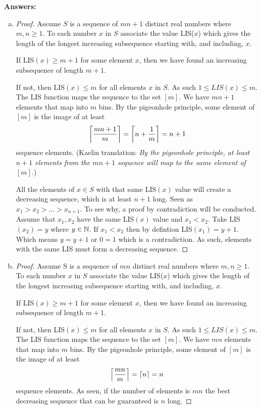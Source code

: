 \documentclass{article}
\begin{document}
\textbf{Answers:}
\begin{enumerate}[(a)]
    \item \begin{proof}
    Assume $S$ is a sequence of $mn+1$ distinct real numbers where $m,n \ge 1$. To each number $x$ in $S$ associate the value LIS($x$) which gives the length of the longest increasing subsequence starting with, and including, $x$. 
    
    \medskip
    If LIS$(x) \ge m + 1$ for some element $x$, then we have found an increasing subsequence of length $m + 1$. 
    
    \medskip
    If not, then LIS$(x) \le m$ for all elements $x$ in $S$. As such $1 \le LIS(x) \le m$. The LIS function maps the sequence to the set $[m]$. We have $mn+1$ elements that map into $m$ bins. By the pigeonhole principle, some element of $[m]$ is the image of at least
    \begin{equation*}
        \left\lceil \dfrac{mn+1}{m} \right\rceil = \left\lceil n+\dfrac{1}{m} \right\rceil = n+1
    \end{equation*}
    sequence elements. (Kaelin translation: \textit{By the pigeonhole principle, at least $n+1$ elements from the $mn+1$ sequence will map to the same element of $[m]$}.)

    \medskip
    All the elements of $x \in S$ with that same LIS$(x)$ value will create a decreasing sequence, which is at least $n+1$ long. Seen as $x_1 > x_2 > \dots > x_{n+1}$. To see why, a proof by contradiction will be conducted. Assume that $x_1, x_2$ have the same LIS$(x)$ value and $x_1 < x_2$. Take LIS$(x_2) = y$ where $y \in \mathbb N$. If $x_1 < x_2$ then by defintion LIS$(x_1) = y + 1$. Which means $y = y + 1$ or $0 = 1$ which is a contradiction. As such, elements with the same LIS must form a decreasing sequence.
    \end{proof}

    \item \begin{proof}
    Assume S is a  sequence of $mn$ distinct real numbers where $m,n \ge 1$. To each number $x$ in $S$ associate the value LIS($x$) which gives the length of the longest increasing subsequence starting with, and including, $x$. 
    
    \medskip
    If LIS$(x) \ge m + 1$ for some element $x$, then we have found an increasing subsequence of length $m + 1$. 
    
    \medskip
    If not, then LIS$(x) \le m$ for all elements $x$ in $S$. As such $1 \le LIS(x) \le m$. The LIS function maps the sequence to the set $[m]$. We have $mn$ elements that map into $m$ bins. By the pigeonhole principle, some element of $[m]$ is the image of at least
    \begin{equation*}
        \left\lceil \dfrac{mn}{m} \right\rceil = \left\lceil n \right\rceil = n
    \end{equation*}
    sequence elements. As seen, if the number of elements is $mn$ the best decreasing sequence that can be guaranteed is $n$ long.
\end{proof}
\end{enumerate}
\end{document}
